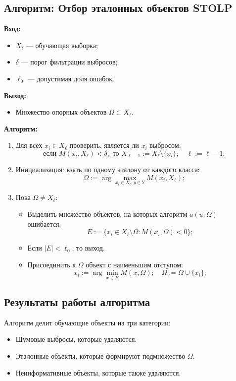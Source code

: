 \subsection*{Алгоритм: Отбор эталонных объектов STOLP}
\textbf{Вход:} 
\begin{itemize}
    \item \( X_\ell \) — обучающая выборка;
    \item \( \delta \) — порог фильтрации выбросов;
    \item \( \ell_0 \) — допустимая доля ошибок.
\end{itemize}
\textbf{Выход:}
\begin{itemize}
    \item Множество опорных объектов \( \Omega \subset X_\ell \).
\end{itemize}

\textbf{Алгоритм:}
\begin{enumerate}
    \item Для всех \( x_i \in X_\ell \) проверить, является ли \( x_i \) выбросом:
    \[
    \text{если } M(x_i, X_\ell) < \delta, \text{ то } X_{\ell-1} := X_\ell \setminus \{x_i\}; \quad \ell := \ell - 1;
    \]
    \item Инициализация: взять по одному эталону от каждого класса:
    \[
    \Omega := \arg \max_{x_i \in X_\ell, y \in Y} M(x_i, X_\ell);
    \]
    \item Пока \( \Omega \neq X_\ell \):
    \begin{itemize}
        \item Выделить множество объектов, на которых алгоритм \( a(u; \Omega) \) ошибается:
        \[
        E := \{x_i \in X_\ell \setminus \Omega : M(x_i, \Omega) < 0\};
        \]
        \item Если \( |E| < \ell_0 \), то выход.
        \item Присоединить к \( \Omega \) объект с наименьшим отступом:
        \[
        x_i := \arg \min_{x \in E} M(x, \Omega); \quad \Omega := \Omega \cup \{x_i\};
        \]
    \end{itemize}
\end{enumerate}



\subsection*{Результаты работы алгоритма}
Алгоритм делит обучающие объекты на три категории:
\begin{itemize}
    \item Шумовые выбросы, которые удаляются.
    \item Эталонные объекты, которые формируют подмножество $\Omega$.
    \item Неинформативные объекты, которые также удаляются.
\end{itemize}

